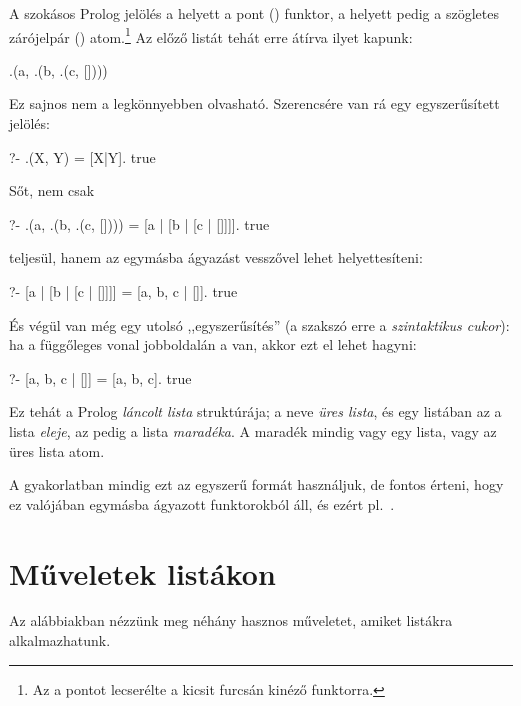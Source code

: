 A szokásos Prolog jelölés a  helyett a
pont () funktor, a  helyett pedig a
szögletes zárójelpár (\pr{[]}) atom.\footnote[2]{Az
 a pontot lecserélte a kicsit
furcsán kinéző  funktorra.}
Az előző listát tehát erre átírva ilyet kapunk:
\index{\pr{[]}}
\begin{query}
.(a, .(b, .(c, [])))
\end{query}
Ez sajnos nem a legkönnyebben olvasható. Szerencsére
van rá egy egyszerűsített jelölés:
\begin{query}
?- .(X, Y) = [X|Y].
true
\end{query}
Sőt, nem csak
\begin{query}
?- .(a, .(b, .(c, []))) = [a | [b | [c | []]]].
true
\end{query}
teljesül, hanem az egymásba ágyazást vesszővel lehet
helyettesíteni:
\begin{query}
?- [a | [b | [c | []]]] = [a, b, c | []].
true
\end{query}
És végül van még egy utolsó ,,egyszerűsítés'' (a
szakszó erre a \emph{szintaktikus cukor}): ha a
függőleges vonal jobboldalán a \pr{[]} van, akkor
ezt el lehet hagyni:
\begin{query}
?- [a, b, c | []] = [a, b, c].
true
\end{query}
Ez tehát a Prolog \emph{láncolt lista} struktúrája;
a \pr{[]} neve \emph{üres lista}, és egy \pr{[X|Y]}
listában az  a lista \emph{eleje}, az 
pedig a lista \emph{maradéka}. A maradék mindig vagy
egy lista, vagy az üres lista atom.

A gyakorlatban mindig ezt az egyszerű formát
használjuk, de fontos érteni, hogy ez valójában
egymásba ágyazott funktorokból áll, és ezért
pl.~\pr{[a, b, c] = [a | [b, c]] = [a, b | [c]] =
  [a, b, c | []]}.

\section{Műveletek listákon}

Az alábbiakban nézzünk meg néhány hasznos műveletet,
amiket listákra alkalmazhatunk.

